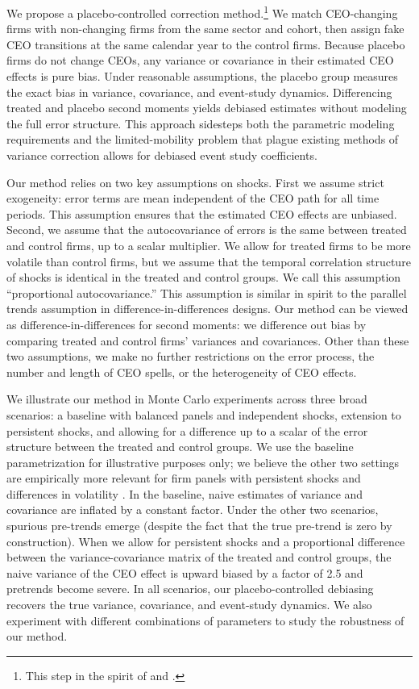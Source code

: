 \documentclass[11pt,a4paper]{article}
\begin{document}
We propose a placebo-controlled correction method.\footnote{This step in the spirit of \cite{fitza2014use} and \cite{jarosiewicz2023revisiting}.} We match CEO-changing firms with non-changing firms from the same sector and cohort, then assign fake CEO transitions at the same calendar year to the control firms. Because placebo firms do not change CEOs, any variance or covariance in their estimated CEO effects is pure bias. Under reasonable assumptions, the placebo group measures the exact bias in variance, covariance, and event-study dynamics. Differencing treated and placebo second moments yields debiased estimates without modeling the full error structure. This approach sidesteps both the parametric modeling requirements and the limited-mobility problem that plague existing methods of variance correction allows for debiased event study coefficients.

Our method relies on two key assumptions on shocks. First we assume strict exogeneity: error terms are mean independent of the CEO path for all time periods. This assumption ensures that the estimated CEO effects are unbiased. Second, we assume that the autocovariance of errors is the same between treated and control firms, up to a scalar multiplier. We allow for treated firms to be more volatile than control firms, but we assume that the temporal correlation structure of shocks is identical in the treated and control groups. We call this assumption ``proportional autocovariance.'' This assumption is similar in spirit to the parallel trends assumption in difference-in-differences designs. Our method can be viewed as difference-in-differences for second moments: we difference out bias by comparing treated and control firms' variances and covariances. Other than these two assumptions, we make no further restrictions on the error process, the number and length of CEO spells, or the heterogeneity of CEO effects. 

We illustrate our method in Monte Carlo experiments across three broad scenarios: a baseline with balanced panels and independent shocks, extension to persistent shocks, and allowing for a difference up to a scalar of the error structure between the treated and control groups. We use the baseline parametrization for illustrative purposes only; we believe the other two settings are empirically more relevant for firm panels with persistent shocks \citep{Olley1996-wy} and differences in volatility \citep{}. In the baseline, naive estimates of variance and covariance are inflated by a constant factor. Under the other two scenarios, spurious pre-trends emerge (despite the fact that the true pre-trend is zero by construction). When we allow for persistent shocks and a proportional difference between the variance-covariance matrix of the treated and control groups, the naive variance of the CEO effect is upward biased by a factor of 2.5 and pretrends become severe. In all scenarios, our placebo-controlled debiasing recovers the true variance, covariance, and event-study dynamics. We also experiment with different combinations of parameters to study the robustness of our method.
\end{document}
